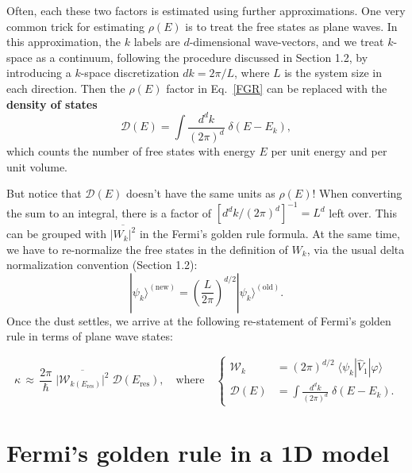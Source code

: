 \documentclass[pra,12pt]{revtex4}
\begin{document}
Often, each these two factors is estimated using further
approximations.  One very common trick for estimating $\rho(E)$ is to
treat the free states as plane waves.  In this approximation, the $k$
labels are $d$-dimensional wave-vectors, and we treat $k$-space as a
continuum, following the procedure discussed in Section 1.2, by
introducing a $k$-space discretization $dk = 2\pi/L$, where $L$ is the
system size in each direction.  Then the $\rho(E)$ factor in
Eq.~\eqref{FGR} can be replaced with the \textbf{density of states}
\begin{equation}
  \mathcal{D}(E) = \int \frac{d^d k}{(2\pi)^d} \; \delta(E - E_k),
\end{equation}
which counts the number of free states with energy $E$ per unit energy
and per unit volume.

But notice that $\mathcal{D}(E)$ doesn't have the same units as
$\rho(E)$!  When converting the sum to an integral, there is a factor
of $\left[d^dk/(2\pi)^d\right]^{-1} = L^{d}$ left over.  This can be
grouped with $\overline{|W_k|^2}$ in the Fermi's golden rule formula.
At the same time, we have to re-normalize the free states in the
definition of $W_k$, via the usual delta normalization convention
(Section 1.2):
\begin{equation}
  |\psi_k\rangle^{(\textrm{new})}
  = \left(\frac{L}{2\pi}\right)^{d/2} |\psi_{k}\rangle^{(\textrm{old})}.
\end{equation}
Once the dust settles, we arrive at the following re-statement of
Fermi's golden rule in terms of plane wave states:
\begin{framed}
  \begin{equation}
    \kappa
    \,\approx\, \frac{2\pi}{\hbar} \;
    \overline{\big|\mathcal{W}_{k(E_\mathrm{res})}\big|^2} \;
    \mathcal{D}(E_{\mathrm{res}}),
    \quad \mathrm{where} \quad \left\{
    \begin{aligned}
      \mathcal{W}_k
      &= (2\pi)^{d/2} \;
      \langle\psi_{k}| \hat{V}_1|\varphi\rangle \\
      \mathcal{D}(E) &= \int \frac{d^dk}{(2\pi)^d} \; \delta(E-E_k).
    \end{aligned}\right.
    \label{FGR2}
  \end{equation}
\end{framed}

\section{Fermi's golden rule in a 1D model}
\label{sec:fgr1d}
\end{document}
